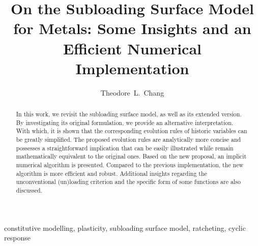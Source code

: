 \documentclass[3p,sort&compress,11pt,fleqn,review]{elsarticle}
\begin{document}
\linenumbers
\begin{abstract}
    \begin{linenumbers}
        In this work, we revisit the subloading surface model, as well as its extended version.
        By investigating its original formulation, we provide an alternative interpretation.
        With which, it is shown that the corresponding evolution rules of historic variables can be greatly simplified.
        The proposed evolution rules are analytically more concise and possesses a straightforward implication that can be easily illustrated while remain mathematically equivalent to the original ones.
        Based on the new proposal, an implicit numerical algorithm is presented.
        Compared to the previous implementation, the new algorithm is more efficient and robust.
        Additional insights regarding the unconventional (un)loading criterion and the specific form of some functions are also discussed.
    \end{linenumbers}
\end{abstract}
\begin{keyword}
    constitutive modelling\sep
    plasticity\sep
    subloading surface model\sep
    ratcheting\sep
    cyclic response
\end{keyword}
\begin{frontmatter}
    \title{On the Subloading Surface Model for Metals: Some Insights and an Efficient Numerical Implementation}
    \author[add1]{Theodore~L.~Chang}
    \address[add1]{IRIS Adlershof, Humboldt-Universität zu Berlin, Berlin, Germany, 12489.}
\end{frontmatter}





\end{document}
